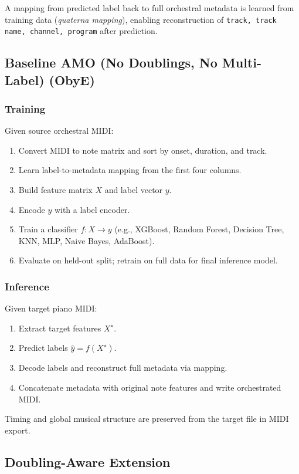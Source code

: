 \documentclass{aimc2026}
\begin{document}
A mapping from predicted label back to full orchestral metadata is learned from training data (\emph{quaterna mapping}), enabling reconstruction of \texttt{track, track name, channel, program} after prediction.

\subsection{Baseline AMO (No Doublings, No Multi-Label) (ObyE)}

\subsubsection{Training}
Given source orchestral MIDI:
\begin{enumerate}
	\item Convert MIDI to note matrix and sort by onset, duration, and track.
	\item Learn label-to-metadata mapping from the first four columns.
	\item Build feature matrix \(X\) and label vector \(y\).
	\item Encode \(y\) with a label encoder.
	\item Train a classifier \(f: X \to y\) (e.g., XGBoost, Random Forest, Decision Tree, KNN, MLP, Naive Bayes, AdaBoost).
	\item Evaluate on held-out split; retrain on full data for final inference model.
\end{enumerate}

\subsubsection{Inference}
Given target piano MIDI:
\begin{enumerate}
	\item Extract target features \(X^\star\).
	\item Predict labels \(\hat{y}=f(X^\star)\).
	\item Decode labels and reconstruct full metadata via mapping.
	\item Concatenate metadata with original note features and write orchestrated MIDI.
\end{enumerate}
Timing and global musical structure are preserved from the target file in MIDI export.

\subsection{Doubling-Aware Extension}
\end{document}
